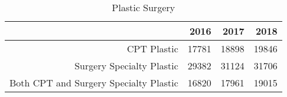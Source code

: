 \begin{table}[ht]
\centering
\begin{tabular}{rrrr}
  \hline
 & 2016 & 2017 & 2018 \\ 
  \hline
CPT Plastic & 17781 & 18898 & 19846 \\ 
  Surgery Specialty Plastic & 29382 & 31124 & 31706 \\ 
  Both CPT and Surgery Specialty Plastic & 16820 & 17961 & 19015 \\ 
   \hline
\end{tabular}
\caption{Plastic Surgery} 
\end{table}

